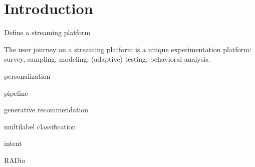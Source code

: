 
\chapter{Introduction}
\label{chapter:introduction}


Define a streaming platform


The user journey on a streaming platform is a unique experimentation platform: survey, sampling, modeling, (adaptive) testing, behavioral analysis.  

personalization

pipeline

generative recommendation

multilabel classification

intent

RADio







